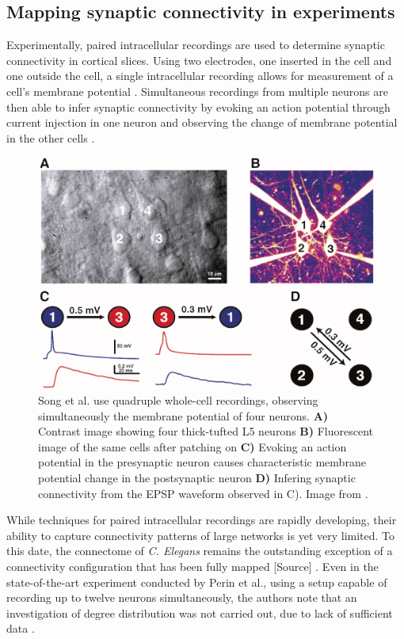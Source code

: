 \subsection*{Mapping synaptic connectivity in experiments}

Experimentally, paired intracellular recordings are used to determine
synaptic connectivity in cortical slices. Using two electrodes, one
inserted in the cell and one outside the cell, a single intracellular
recording allows for measurement of a cell's membrane potential
\cite{Brette_Neural-activity}%
 \cite{Scholarpedia-IntracellularRecording}. Simultaneous
recordings from multiple neurons are then able to infer synaptic
connectivity by evoking an action potential through current injection
in one neuron and observing the change of membrane potential in the
other cells \cite{Song2005}.

\vspace{0.35cm}
\begin{figure}[bth]
  \centering
  \includegraphics[width=.75\linewidth]{gfx/song2005-quadruplet_recordings.png}
  \caption{Song et al. use quadruple whole-cell recordings, observing
    simultaneously the membrane potential of four neurons.
    \textbf{A)} Contrast image showing four thick-tufted L5 neurons
    \textbf{B)} Fluorescent image of the same cells after patching on
    \textbf{C)} Evoking an action potential in the presynaptic neuron
    causes characteristic membrane potential change in the
    postsynaptic neuron \textbf{D)} Infering synaptic connectivity
    from the EPSP waveform observed in C). Image from \cite{Song2005}.
  }
\end{figure}
\vspace{0.45cm}

While techniques for paired intracellular recordings are rapidly
developing, their ability to capture connectivity patterns of large
networks is yet very limited. To this date, the connectome of
\textit{C. Elegans} remains the outstanding exception of a
connectivity configuration that has been fully mapped
[\textcolor{linkgrey}{Source}]%
. Even in the state-of-the-art experiment conducted by Perin et al.,
using a setup capable of recording up to twelve neurons
simultaneously, the authors note that an investigation of degree
distribution was not carried out, due to lack of sufficient data
\cite{Perin2011}.


